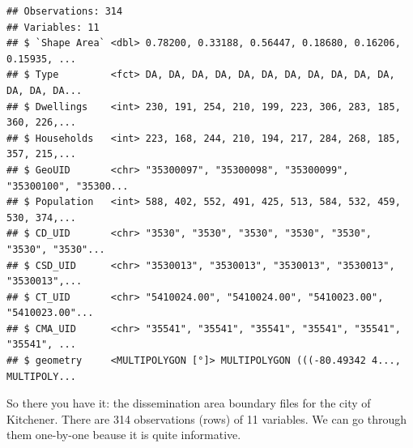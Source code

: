 \documentclass[
]{article}
\begin{document}
\begin{verbatim}
## Observations: 314
## Variables: 11
## $ `Shape Area` <dbl> 0.78200, 0.33188, 0.56447, 0.18680, 0.16206, 0.15935, ...
## $ Type         <fct> DA, DA, DA, DA, DA, DA, DA, DA, DA, DA, DA, DA, DA, DA...
## $ Dwellings    <int> 230, 191, 254, 210, 199, 223, 306, 283, 185, 360, 226,...
## $ Households   <int> 223, 168, 244, 210, 194, 217, 284, 268, 185, 357, 215,...
## $ GeoUID       <chr> "35300097", "35300098", "35300099", "35300100", "35300...
## $ Population   <int> 588, 402, 552, 491, 425, 513, 584, 532, 459, 530, 374,...
## $ CD_UID       <chr> "3530", "3530", "3530", "3530", "3530", "3530", "3530"...
## $ CSD_UID      <chr> "3530013", "3530013", "3530013", "3530013", "3530013",...
## $ CT_UID       <chr> "5410024.00", "5410024.00", "5410023.00", "5410023.00"...
## $ CMA_UID      <chr> "35541", "35541", "35541", "35541", "35541", "35541", ...
## $ geometry     <MULTIPOLYGON [°]> MULTIPOLYGON (((-80.49342 4..., MULTIPOLY...
\end{verbatim}

So there you have it: the dissemination area boundary files for the city
of Kitchener. There are 314 observations (rows) of 11 variables. We can
go through them one-by-one beause it is quite informative.
\end{document}
